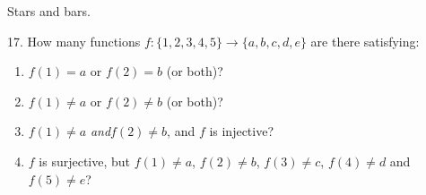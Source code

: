 \documentclass[10pt,]{book}
\theoremstyle{plain}
\theoremstyle{definition}
\numberwithin{equation}{chapter}
\begin{document}
\begin{exerciselist}
          Stars and bars.
        \item[17.]\hypertarget{exercise-136}{}
            How many functions \(f: \{1,2,3,4,5\} \to \{a,b,c,d,e\}\) are there satisfying:
          \leavevmode%
\begin{enumerate}[label=(\alph*)]
\item\hypertarget{li-460}{}\(f(1) = a\) or \(f(2) = b\) (or both)?%
\item\hypertarget{li-461}{}\(f(1) \ne a\) or \(f(2) \ne b\) (or both)?%
\item\hypertarget{li-462}{}\(f(1) \ne a\)\emph{ and}\(f(2) \ne b\), and \(f\) is injective?%
\item\hypertarget{li-463}{}
                \(f\) is surjective, but \(f(1) \ne a\), \(f(2) \ne b\), \(f(3) \ne c\), \(f(4) \ne d\) and \(f(5) \ne e\)?
\end{enumerate}


\end{exerciselist}
\end{document}
